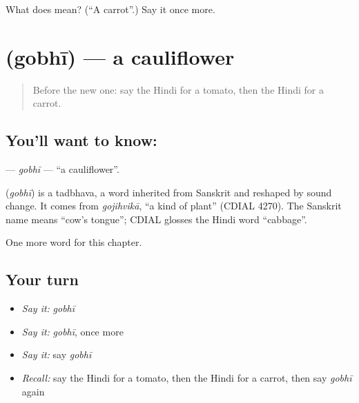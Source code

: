 \begin{tcolorbox}[breakable,colback=teal!4,colframe=teal!35!black,title={Before you move on}]
What does  mean? (\textquotedblleft{}A carrot\textquotedblright{}.) Say it once more.
\end{tcolorbox}
\section[\texorpdfstring{\hi{गोभी} (gobhī)}{गोभी (gobhī)}]{ (gobhī) — a cauliflower}

\label{lesson:HI-C138-gobhi}



\begin{quote}
Before the new one: say the Hindi for a tomato, then the Hindi for a carrot.
\end{quote}

\subsection*{You'll want to know: }
\textbf{} — \emph{gobhī} — \textquotedblleft{}a cauliflower\textquotedblright{}.

\begin{cousinweb}
\textbf{} (\emph{gobhī}) is a tadbhava, a word inherited from Sanskrit and reshaped by sound change. It comes from \emph{gojihvikā}, \textquotedblleft{}a kind of plant\textquotedblright{} (CDIAL 4270). The Sanskrit name means \textquotedblleft{}cow's tongue\textquotedblright{}; CDIAL glosses the Hindi word \textquotedblleft{}cabbage\textquotedblright{}.
\end{cousinweb}

\begin{grammarlens}[title={What you've built}]
One more word for this chapter.
\end{grammarlens}

\subsection*{Your turn}
\begin{itemize}
\raggedright
  \item \emph{Say it:} \emph{gobhī}
  \item \emph{Say it:} \emph{gobhī}, once more
  \item \emph{Say it:} say \emph{gobhī}
  \item \emph{Recall:} say the Hindi for a tomato, then the Hindi for a carrot, then say \emph{gobhī} again
\end{itemize}

